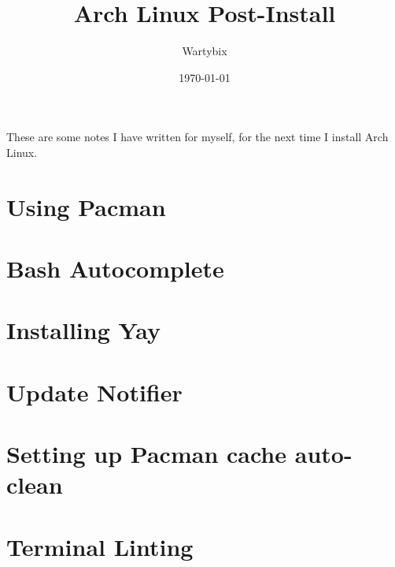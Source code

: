 \documentclass[a4paper]{article}
\title{Arch Linux Post-Install}
\author{Wartybix}
\date{\today}
\begin{document}
\maketitle

These are some notes I have written for myself, for the next time I install Arch Linux.

\section{Using Pacman}

\section{Bash Autocomplete}

\section{Installing Yay}

\section{Update Notifier}

\section{Setting up Pacman cache auto-clean}

\section{Terminal Linting}
\end{document}
